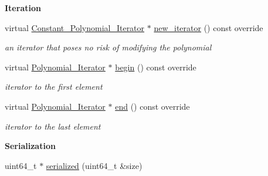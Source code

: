 \begin{Indent}\textbf{ Iteration}\par
\begin{DoxyCompactItemize}
\item 
\mbox{\label{group__polygroup_ab69dc9c6fcea390d0ab3c36379a3ee9c}} 
virtual \hyperlink{group___iterator_group_class_constant___polynomial___iterator}{Constant\+\_\+\+Polynomial\+\_\+\+Iterator} $\ast$ \hyperlink{group__polygroup_ab69dc9c6fcea390d0ab3c36379a3ee9c}{new\+\_\+iterator} () const override
\begin{DoxyCompactList}\small\item\em an iterator that poses no risk of modifying the polynomial \end{DoxyCompactList}\item 
\mbox{\label{group__polygroup_aaf17fe042545372d6ceb5858f3e3afac}} 
virtual \hyperlink{group___iterator_group_class_polynomial___iterator}{Polynomial\+\_\+\+Iterator} $\ast$ \hyperlink{group__polygroup_aaf17fe042545372d6ceb5858f3e3afac}{begin} () const override
\begin{DoxyCompactList}\small\item\em iterator to the first element \end{DoxyCompactList}\item 
\mbox{\label{group__polygroup_aee1e3c821a17fa655b02bab7d2bec2f2}} 
virtual \hyperlink{group___iterator_group_class_polynomial___iterator}{Polynomial\+\_\+\+Iterator} $\ast$ \hyperlink{group__polygroup_aee1e3c821a17fa655b02bab7d2bec2f2}{end} () const override
\begin{DoxyCompactList}\small\item\em iterator to the last element \end{DoxyCompactList}\end{DoxyCompactItemize}
\end{Indent}
\begin{Indent}\textbf{ Serialization}\par
\begin{DoxyCompactItemize}
\item 
uint64\+\_\+t $\ast$ \hyperlink{group__polygroup_aafc581313f33e812add8db45cfaa1492}{serialized} (uint64\+\_\+t \&size)
\end{DoxyCompactItemize}
\end{Indent}
